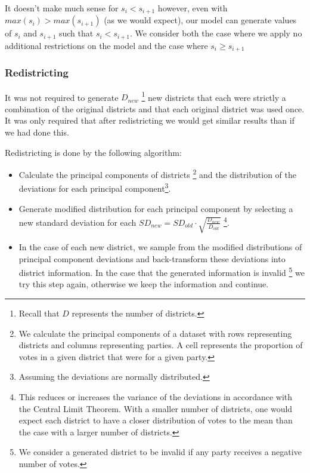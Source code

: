 \documentclass{article}
\begin{document}
It doesn't make much sense for $s_i < s_{i+1}$ however, even with $max(s_i) > max(s_{i+1})$ (as we would expect), our model can generate values of $s_i$ and $s_{i+1}$ such that $s_i < s_{i+1}$. We consider both the case where we apply no additional restrictions on the model and the case where $s_i \geq s_{i+1}$

\subsubsection{Redistricting}
It was not required to generate $D_{new}$ \footnote{Recall that $D$ represents the number of districts.} new districts that each were strictly a combination of the original districts and that each original district was used once. It was only required that after redistricting we would get similar results than if we had done this.

Redistricting is done by the following algorithm:

\begin{itemize}
\item Calculate the principal components of districts \footnote{We calculate the principal components of a dataset with rows representing districts and columns representing parties. A cell represents the proportion of votes in a given district that were for a given party.} and the distribution of the deviations for each principal component\footnote{Assuming the deviations are normally distributed.}.

\item Generate modified distribution for each principal component by selecting a new standard deviation for each $SD_{new} = SD_{old} \cdot \sqrt{\frac{D_{new}}{D_{old}}}$ \footnote{This reduces or increases the variance of the deviations in accordance with the Central Limit Theorem. With a smaller number of districts, one would expect each district to have a closer distribution of votes to the mean than the case with a larger number of districts.}.

\item In the case of each new district, we sample from the modified distributions of principal component deviations and back-transform these deviations into district information. In the case that the generated information is invalid \footnote{We consider a generated district to be invalid if any party receives a negative number of votes.} we try this step again, otherwise we keep the information and continue.
\end{itemize}
\end{document}
